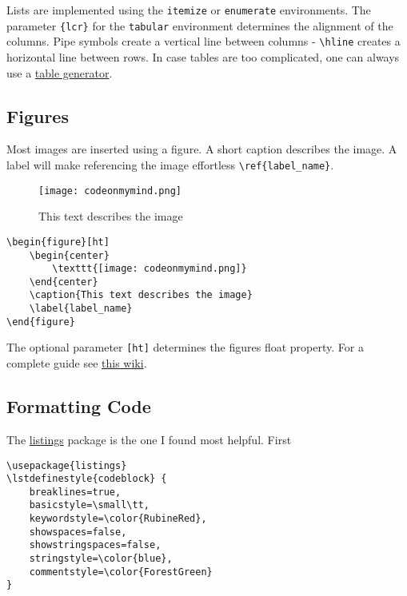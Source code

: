\documentclass{article}
\begin{document}
Lists are implemented using the \texttt{itemize} or \texttt{enumerate} environments. The parameter \verb|{lcr}| for the \texttt{tabular} environment determines the alignment of the columns. Pipe symbols create a vertical line between columns - \verb|\hline| creates a horizontal line between rows. In case tables are too complicated, one can always use a \href{https://www.tablesgenerator.com/}{table generator}. 


\subsection*{Figures}
Most images are inserted using a figure. A short caption describes the image. A label will make referencing the image effortless \verb|\ref{label_name}|.

\begin{figure}[ht]
    \begin{center}
        \texttt{[image: codeonmymind.png]}
    \end{center}
    \caption{This text describes the image}
    \label{label_name}
\end{figure}

\begin{lstlisting}[style=codeblock]
\begin{figure}[ht]
    \begin{center}
        \texttt{[image: codeonmymind.png]}
    \end{center}
    \caption{This text describes the image}
    \label{label_name}
\end{figure}
\end{lstlisting}

The optional parameter \verb|[ht]| determines the figures float property. For a complete guide see \href{https://en.wikibooks.org/wiki/LaTeX/Floats,_Figures_and_Captions#Figures}{this wiki}.


\subsection*{Formatting Code}
The \href{http://texdoc.net/texmf-dist/doc/latex/listings/listings.pdf}{listings} package is the one I found most helpful. First 

\begin{lstlisting}[style=codeblock]
\usepackage{listings} 
\lstdefinestyle{codeblock} {
    breaklines=true,
    basicstyle=\small\tt,
    keywordstyle=\color{RubineRed},
    showspaces=false,
    showstringspaces=false,
    stringstyle=\color{blue},
    commentstyle=\color{ForestGreen}
}
\end{lstlisting}
\end{document}
